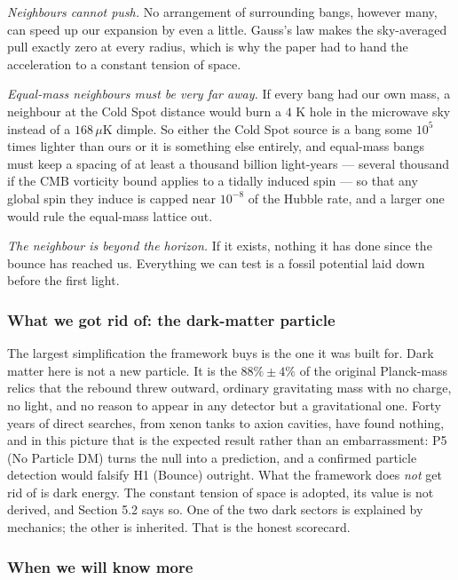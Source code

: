 \documentclass[
]{article}
\begin{document}
\emph{Neighbours cannot push.} No arrangement of surrounding bangs,
however many, can speed up our expansion by even a little. Gauss's law
makes the sky-averaged pull exactly zero at every radius, which is why
the paper had to hand the acceleration to a constant tension of space.

\emph{Equal-mass neighbours must be very far away.} If every bang had
our own mass, a neighbour at the Cold Spot distance would burn a \(4\) K
hole in the microwave sky instead of a \(168\,\mu\)K dimple. So either
the Cold Spot source is a bang some \(10^{5}\) times lighter than ours
or it is something else entirely, and equal-mass bangs must keep a
spacing of at least a thousand billion light-years --- several thousand
if the CMB vorticity bound applies to a tidally induced spin --- so that
any global spin they induce is capped near \(10^{-8}\) of the Hubble
rate, and a larger one would rule the equal-mass lattice out.

\emph{The neighbour is beyond the horizon.} If it exists, nothing it has
done since the bounce has reached us. Everything we can test is a fossil
potential laid down before the first light.

\hypertarget{what-we-got-rid-of-the-dark-matter-particle}{%
\subsubsection{What we got rid of: the dark-matter
particle}\label{what-we-got-rid-of-the-dark-matter-particle}}

The largest simplification the framework buys is the one it was built
for. Dark matter here is not a new particle. It is the \(88\% \pm 4\%\)
of the original Planck-mass relics that the rebound threw outward,
ordinary gravitating mass with no charge, no light, and no reason to
appear in any detector but a gravitational one. Forty years of direct
searches, from xenon tanks to axion cavities, have found nothing, and in
this picture that is the expected result rather than an embarrassment:
P5 (No Particle DM) turns the null into a prediction, and a confirmed
particle detection would falsify H1 (Bounce) outright. What the
framework does \emph{not} get rid of is dark energy. The constant
tension of space is adopted, its value is not derived, and Section 5.2
says so. One of the two dark sectors is explained by mechanics; the
other is inherited. That is the honest scorecard.

\hypertarget{when-we-will-know-more}{%
\subsubsection{When we will know more}\label{when-we-will-know-more}}
\end{document}
